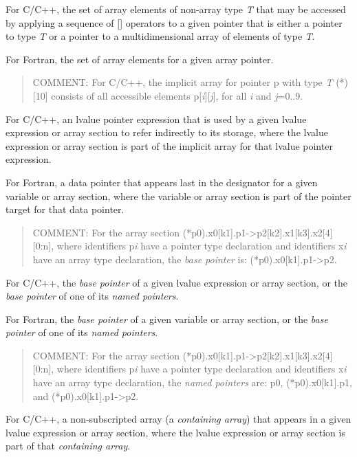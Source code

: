 \glossarydefstart
For C/C++, the set of array elements of non-array type \emph{T} that may be
accessed by applying a sequence of [] operators to a given pointer that is
either a pointer to type \emph{T} or a pointer to a multidimensional array of
elements of type \emph{T}.

For Fortran, the set of array elements for a given array pointer.
\begin{quote}
COMMENT: For C/C++, the implicit array for pointer p with type \emph{T} (*)[10] 
consists of all accessible elements p[\emph{i}][\emph{j}], for all 
\emph{i} and \emph{j}=0..9.
\end{quote}
\glossarydefend

\glossarydefstart
For C/C++, an lvalue pointer expression that is used by a given lvalue
expression or array section to refer indirectly to its storage, where
the lvalue expression or array section is part of the implicit array for that
lvalue pointer expression.

For Fortran, a data pointer that appears last in the designator for a given
variable or array section, where the variable or array section is part
of the pointer target for that data pointer.

\begin{quote}
COMMENT: For the array section (*p0).x0[k1].p1->p2[k2].x1[k3].x2[4][0:n],
where identifiers p\emph{i} have a pointer type declaration
and identifiers x\emph{i} have an array type declaration, the 
\emph{base pointer} is: (*p0).x0[k1].p1->p2.
\end{quote}
\glossarydefend

\glossarydefstart
For C/C++, the \emph{base pointer} of a given lvalue expression or 
array section, or the \emph{base pointer} of one of its \emph{named pointers}.

For Fortran, the \emph{base pointer} of a given variable or array section, or
the \emph{base pointer} of one of its \emph{named pointers}.

\begin{quote}
COMMENT: For the array section (*p0).x0[k1].p1->p2[k2].x1[k3].x2[4][0:n],
where identifiers p\emph{i} have a pointer type declaration
and identifiers x\emph{i} have an array type declaration, the 
\emph{named pointers} are: 
p0, 
(*p0).x0[k1].p1,
and 
(*p0).x0[k1].p1->p2.
\end{quote}
\glossarydefend

\glossarydefstart
For C/C++, a non-subscripted array (a \emph{containing array}) that appears in
a given lvalue expression or array section, where the lvalue expression or
array section is part of that \emph{containing array}.

